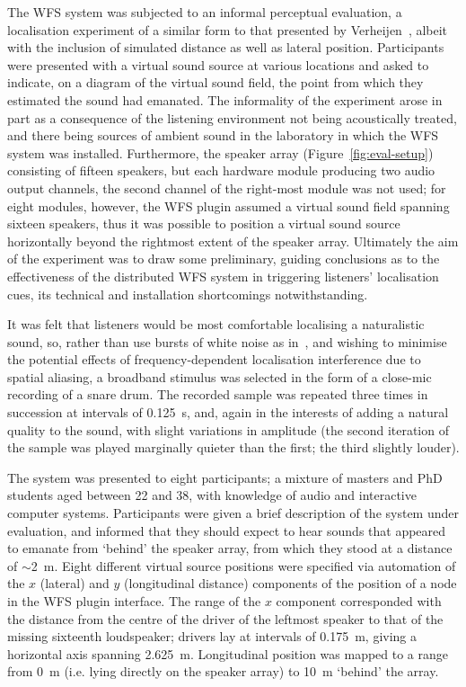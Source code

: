 \documentclass[utf8]{FrontiersinHarvard}
\newcommand{\figref}[1]{Figure~\ref{#1}}
\begin{document}
    The WFS system was subjected to an informal perceptual evaluation, a
    localisation experiment of a similar form to that presented by
    Verheijen~\citep[ch.~6]{verheijen_sound_1998}, albeit with the inclusion of
    simulated distance as well as lateral position.
    Participants were presented with a virtual sound source at various locations
    and asked to indicate, on a diagram of the virtual sound field, the point
    from which they estimated the sound had emanated.
    The informality of the experiment arose in part as a consequence of the
    listening environment not being acoustically treated, and there being
    sources of ambient sound in the laboratory in which the WFS system was
    installed.
    Furthermore, the speaker array (\figref{fig:eval-setup}) consisting of
    fifteen speakers, but each hardware module producing two audio output
    channels, the second channel of the right-most module was not used;
    for eight modules, however, the WFS plugin assumed a virtual sound field
    spanning sixteen speakers, thus it was possible to position a virtual sound
    source horizontally beyond the rightmost extent of the speaker array.
    Ultimately the aim of the experiment was to draw some preliminary, guiding
    conclusions as to the effectiveness of the distributed WFS system in
    triggering listeners' localisation cues, its technical and installation
    shortcomings notwithstanding.

    It was felt that listeners would be most comfortable localising a
    naturalistic sound, so, rather than use bursts of white noise as
    in~\citep{verheijen_sound_1998}, and wishing to minimise the potential
    effects of frequency-dependent localisation interference due to spatial
    aliasing, a broadband stimulus was selected in the form of a close-mic
    recording of a snare drum.
    The recorded sample was repeated three times in succession at intervals of
    \qty{.125}{\s}, and, again in the interests of adding a natural quality to
    the sound, with slight variations in amplitude (the second iteration of the
    sample was played marginally quieter than the first; the third slightly
    louder).

    The system was presented to eight participants; a mixture of masters and PhD
    students aged between 22 and 38, with knowledge of audio and interactive
    computer systems.
    Participants were given a brief description of the system under evaluation,
    and informed that they should expect to hear sounds that appeared to emanate
    from `behind' the speaker array, from which they stood at a distance of
    $\sim$\qty{2}{\m}.
    Eight different virtual source positions were specified via automation of the
    $x$ (lateral) and $y$ (longitudinal distance) components of the position of a
    node in the WFS plugin interface.
    The range of the $x$ component corresponded with the distance from the centre of
    the driver of the leftmost speaker to that of the missing sixteenth loudspeaker;
    drivers lay at intervals of \qty{.175}{\m}, giving a horizontal axis spanning
    \qty{2.625}{\m}.
    Longitudinal position was mapped to a range from \qty{0}{\m} (i.e. lying
    directly on the speaker array) to \qty{10}{\m} `behind' the array.
\end{document}
